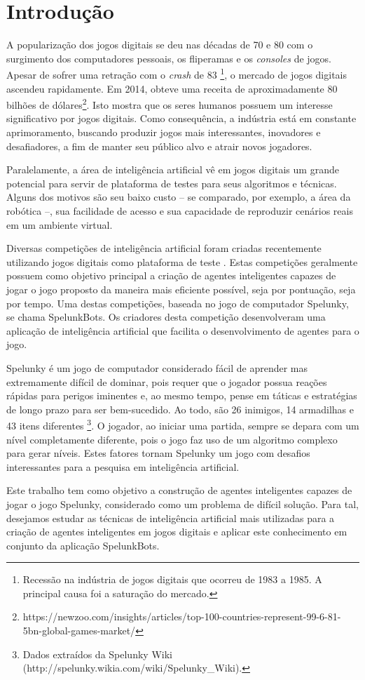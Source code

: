 \chapter{\label{chap:intro}Introdução}
A popularização dos jogos digitais se deu nas décadas de 70 e 80 com o
surgimento dos computadores pessoais, os fliperamas e os \textit{consoles} de
jogos. Apesar de sofrer uma retração com o \textit{crash} de 83
\footnote{Recessão na indústria de jogos digitais que ocorreu de 1983 a 1985. A
principal causa foi a saturação do mercado.}, o mercado de jogos digitais
ascendeu rapidamente. Em 2014, obteve uma receita de aproximadamente 80 bilhões
de dólares\footnote{https://newzoo.com/insights/articles/top-100-countries-represent-99-6-81-5bn-global-games-market/}.
Isto mostra que os seres humanos possuem um interesse significativo por jogos
digitais. Como consequência, a indústria está em constante aprimoramento,
buscando produzir jogos mais interessantes, inovadores e desafiadores, a fim de
manter seu público alvo e atrair novos jogadores.

Paralelamente, a área de inteligência artificial vê em jogos digitais um grande
potencial para servir de plataforma de testes para seus algoritmos e técnicas.
Alguns dos motivos são seu baixo custo -- se comparado, por exemplo, a área da
robótica --, sua facilidade de acesso e sua capacidade de reproduzir cenários
reais em um ambiente virtual.

Diversas competições de inteligência artificial foram criadas recentemente
utilizando jogos digitais como plataforma de teste \cite{GameAiCompetition}.
Estas competições geralmente possuem como objetivo principal a criação de
agentes inteligentes capazes de jogar o jogo proposto da maneira mais eficiente
possível, seja por pontuação, seja por tempo. Uma destas competições, baseada no
jogo de computador Spelunky, se chama SpelunkBots. Os criadores desta competição
desenvolveram uma aplicação de inteligência artificial que facilita o
desenvolvimento de agentes para o jogo.

Spelunky é um jogo de computador considerado fácil de aprender mas extremamente
difícil de dominar, pois requer que o jogador possua reações rápidas para
perigos iminentes e, ao mesmo tempo, pense em táticas e estratégias de longo
prazo para ser bem-sucedido. Ao todo, são 26 inimigos, 14 armadilhas e 43 itens
diferentes \footnote{Dados extraídos da Spelunky Wiki
(http://spelunky.wikia.com/wiki/Spelunky\_Wiki).}. O jogador, ao iniciar uma
partida, sempre se depara com um nível completamente diferente, pois o jogo faz
uso de um algoritmo complexo para gerar níveis. Estes fatores tornam Spelunky um
jogo com desafios interessantes para a pesquisa em inteligência artificial.

Este trabalho tem como objetivo a construção de agentes inteligentes capazes de
jogar o jogo Spelunky, considerado como um problema de difícil solução. Para
tal, desejamos estudar as técnicas de inteligência artificial mais utilizadas
para a criação de agentes inteligentes em jogos digitais e aplicar este
conhecimento em conjunto da aplicação SpelunkBots.
